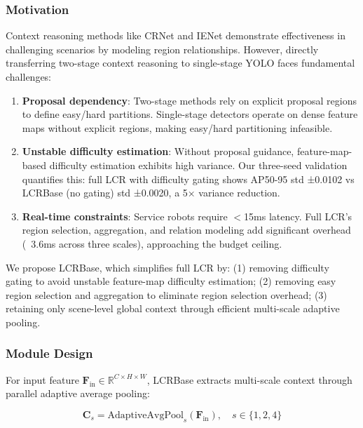 \documentclass[journal]{IEEEtran}
\begin{document}
\subsubsection{Motivation}

Context reasoning methods like CRNet and IENet demonstrate effectiveness in challenging scenarios by modeling region relationships. However, directly transferring two-stage context reasoning to single-stage YOLO faces fundamental challenges:

\begin{enumerate}
    \item \textbf{Proposal dependency}: Two-stage methods rely on explicit proposal regions to define easy/hard partitions. Single-stage detectors operate on dense feature maps without explicit regions, making easy/hard partitioning infeasible.

    \item \textbf{Unstable difficulty estimation}: Without proposal guidance, feature-map-based difficulty estimation exhibits high variance. Our three-seed validation quantifies this: full LCR with difficulty gating shows AP50-95 std ±0.0102 vs LCRBase (no gating) std ±0.0020, a 5× variance reduction.

    \item \textbf{Real-time constraints}: Service robots require $<$15ms latency. Full LCR's region selection, aggregation, and relation modeling add significant overhead (~3.6ms across three scales), approaching the budget ceiling.
\end{enumerate}

We propose LCRBase, which simplifies full LCR by: (1) removing difficulty gating to avoid unstable feature-map difficulty estimation; (2) removing easy region selection and aggregation to eliminate region selection overhead; (3) retaining only scene-level global context through efficient multi-scale adaptive pooling.

\subsubsection{Module Design}

For input feature $\mathbf{F}_{\text{in}} \in \mathbb{R}^{C \times H \times W}$, LCRBase extracts multi-scale context through parallel adaptive average pooling:

\begin{equation}
\mathbf{C}_s = \text{AdaptiveAvgPool}_s(\mathbf{F}_{\text{in}}), \quad s \in \{1, 2, 4\}
\end{equation}
\end{document}
